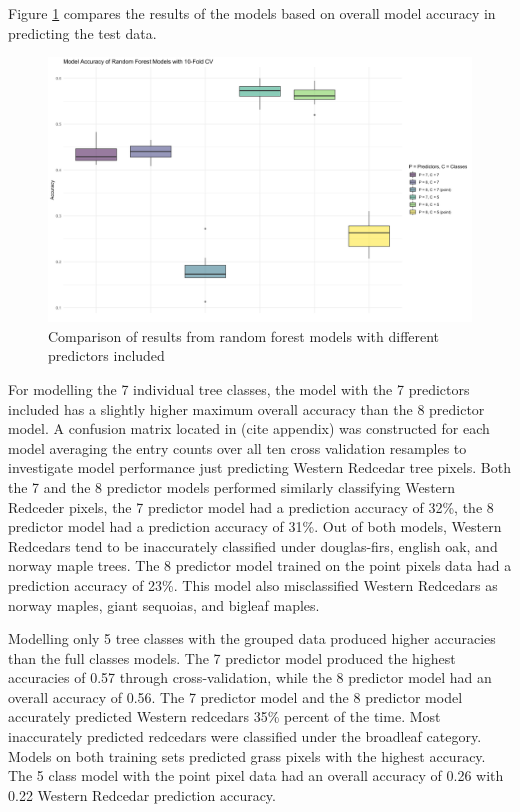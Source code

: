 \documentclass[12pt,twoside]{reedthesis}
\begin{document}
Figure \ref{fig:rfresults} compares the results of the models based on overall model accuracy in predicting the test data.
\begin{figure}

{\centering \includegraphics[width=0.9\linewidth]{figure/rfresults} 

}

\caption{Comparison of results from random forest models with different predictors included}\label{fig:rfresults}
\end{figure}
For modelling the 7 individual tree classes, the model with the 7 predictors included has a slightly higher maximum overall accuracy than the 8 predictor model. A confusion matrix located in (cite appendix) was constructed for each model averaging the entry counts over all ten cross validation resamples to investigate model performance just predicting Western Redcedar tree pixels. Both the 7 and the 8 predictor models performed similarly classifying Western Redceder pixels, the 7 predictor model had a prediction accuracy of 32\%, the 8 predictor model had a prediction accuracy of 31\%. Out of both models, Western Redcedars tend to be inaccurately classified under douglas-firs, english oak, and norway maple trees. The 8 predictor model trained on the point pixels data had a prediction accuracy of 23\%. This model also misclassified Western Redcedars as norway maples, giant sequoias, and bigleaf maples.

Modelling only 5 tree classes with the grouped data produced higher accuracies than the full classes models. The 7 predictor model produced the highest accuracies of 0.57 through cross-validation, while the 8 predictor model had an overall accuracy of 0.56. The 7 predictor model and the 8 predictor model accurately predicted Western redcedars 35\% percent of the time. Most inaccurately predicted redcedars were classified under the broadleaf category. Models on both training sets predicted grass pixels with the highest accuracy. The 5 class model with the point pixel data had an overall accuracy of 0.26 with 0.22 Western Redcedar prediction accuracy.
\end{document}
